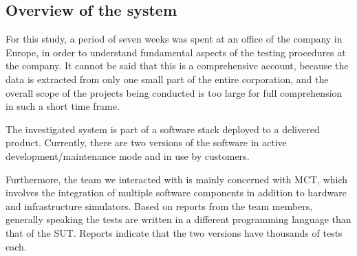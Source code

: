 %





\subsection{Overview of the system}

For this study, a period of seven weeks was spent at an office of the company in Europe, in order to understand fundamental aspects of the testing procedures at the company.
It cannot be said that this is a comprehensive account, because the data is extracted from only one small part of the entire corporation, and the overall scope of the projects being conducted is too large for full comprehension in such a short time frame.

The investigated system is part of a software stack deployed to a delivered product.
Currently, there are two versions of the software in active development/maintenance mode and in use by customers.

Furthermore, the team we interacted with is mainly concerned with MCT, which involves the integration of multiple software components in addition to hardware and infrastructure simulators.
Based on reports from the team members, generally speaking the tests are written in a different programming language than that of the SUT.
Reports indicate that the two versions have thousands of tests each.



%
%
%
